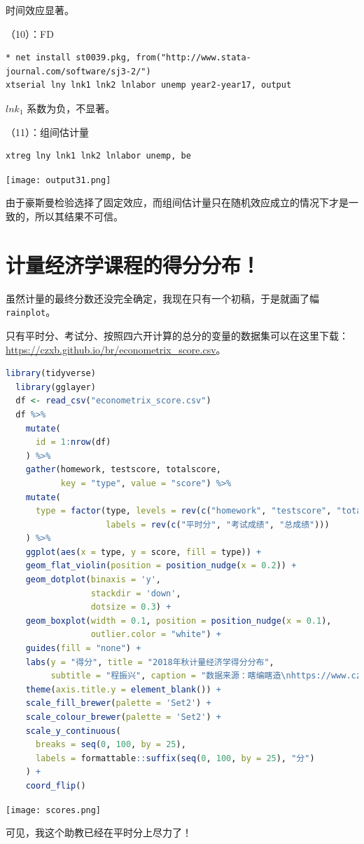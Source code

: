 \documentclass[cn,fancy,blue,11pt]{elegantbook}
\begin{document}
时间效应显著。

（10）：FD

\begin{lstlisting}
* net install st0039.pkg, from("http://www.stata-journal.com/software/sj3-2/")
xtserial lny lnk1 lnk2 lnlabor unemp year2-year17, output
\end{lstlisting}

\(lnk_1\) 系数为负，不显著。

（11）：组间估计量

\begin{lstlisting}
xtreg lny lnk1 lnk2 lnlabor unemp, be
\end{lstlisting}

\noindent\texttt{[image: output31.png]}

由于豪斯曼检验选择了固定效应，而组间估计量只在随机效应成立的情况下才是一致的，所以其结果不可信。

\nocite{*}


\appendix

\chapter{计量经济学课程的得分分布！}

虽然计量的最终分数还没完全确定，我现在只有一个初稿，于是就画了幅 \lstinline{rainplot}。

只有平时分、考试分、按照四六开计算的总分的变量的数据集可以在这里下载：\url{https://czxb.github.io/br/econometrix_score.csv}。

\begin{lstlisting}[language = R]
  library(tidyverse)
  library(gglayer)
  df <- read_csv("econometrix_score.csv")
  df %>%
    mutate(
      id = 1:nrow(df)
    ) %>%
    gather(homework, testscore, totalscore,
           key = "type", value = "score") %>%
    mutate(
      type = factor(type, levels = rev(c("homework", "testscore", "totalscore")),
                    labels = rev(c("平时分", "考试成绩", "总成绩")))
    ) %>%
    ggplot(aes(x = type, y = score, fill = type)) +
    geom_flat_violin(position = position_nudge(x = 0.2)) +
    geom_dotplot(binaxis = 'y',
                 stackdir = 'down',
                 dotsize = 0.3) +
    geom_boxplot(width = 0.1, position = position_nudge(x = 0.1),
                 outlier.color = "white") +
    guides(fill = "none") +
    labs(y = "得分", title = "2018年秋计量经济学得分分布",
         subtitle = "程振兴", caption = "数据来源：瞎编瞎造\nhttps://www.czxa.top") +
    theme(axis.title.y = element_blank()) +
    scale_fill_brewer(palette = 'Set2') +
    scale_colour_brewer(palette = 'Set2') +
    scale_y_continuous(
      breaks = seq(0, 100, by = 25),
      labels = formattable::suffix(seq(0, 100, by = 25), "分")
    ) +
    coord_flip()
\end{lstlisting}

\noindent\texttt{[image: scores.png]}

可见，我这个助教已经在平时分上尽力了！
\end{document}
